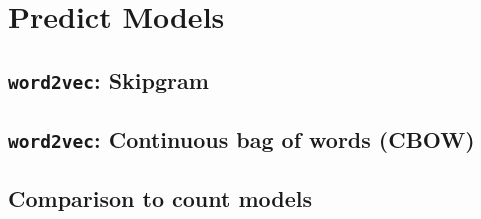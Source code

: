 \chapter{Predict Models}\label{chap:predict-models}
\section{\texttt{word2vec}: Skipgram}
\section{\texttt{word2vec}: Continuous bag of words (CBOW)}
\section{Comparison to count models}
